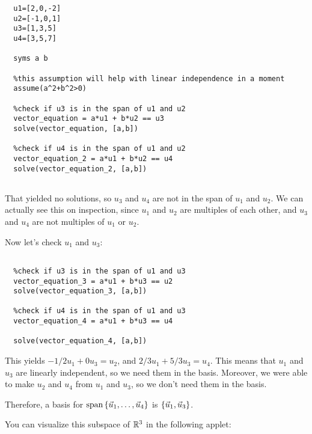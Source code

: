 \documentclass{ximera}
\begin{document}
\begin{exploration}
\begin{solution}
\begin{verbatim}
  u1=[2,0,-2]
  u2=[-1,0,1]
  u3=[1,3,5]
  u4=[3,5,7]

  syms a b

  %this assumption will help with linear independence in a moment
  assume(a^2+b^2>0)

  %check if u3 is in the span of u1 and u2
  vector_equation = a*u1 + b*u2 == u3
  solve(vector_equation, [a,b])

  %check if u4 is in the span of u1 and u2
  vector_equation_2 = a*u1 + b*u2 == u4
  solve(vector_equation_2, [a,b])
  

  \end{verbatim}

  That yielded no solutions, so $u_3$ and $u_4$ are not in the span of $u_1$ and $u_2$. We can actually see this on inspection, since $u_1$ and $u_2$ are multiples of each other, and $u_3$ and $u_4$ are not multiples of $u_1$ or $u_2$.

  Now let's check $u_1$ and $u_3$:

  \begin{verbatim}

  %check if u3 is in the span of u1 and u3
  vector_equation_3 = a*u1 + b*u3 == u2
  solve(vector_equation_3, [a,b])

  %check if u4 is in the span of u1 and u3
  vector_equation_4 = a*u1 + b*u3 == u4

  solve(vector_equation_4, [a,b])

  \end{verbatim}

  This yields $-1/2 u_1 + 0 u_3 = u_2$, and $2/3 u_1 + 5/3 u_3 = u_4$. This means that $u_1$ and $u_3$ are linearly independent, so we need them in the basis. Moreover, we were able to make $u_2$ and $u_4$ from $u_1$ and $u_3$, so we don't need them in the basis.

  Therefore, a basis for $\text{span}\left\{\vec{u}_1,\ldots,\vec{u}_4\right\}$ is $\left\{\vec{u}_1,\vec{u}_3\right\}$.

  You can visualize this subspace of $\mathbb{R}^3$ in the following applet:

  \begin{center}
  \end{center}

\end{solution}



\end{exploration}
\end{document}
